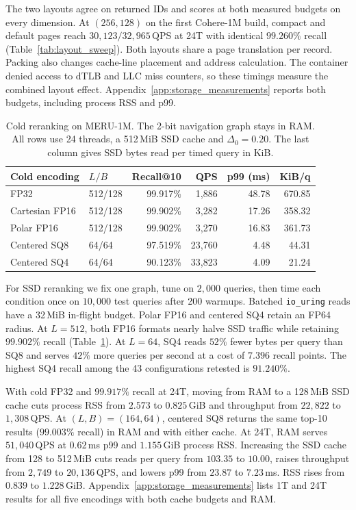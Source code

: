 The two layouts agree on returned IDs and scores at both measured budgets on every dimension. At $(256,128)$ on the first {Cohere-1M} build, compact and default pages reach $30{,}123/32{,}965$\,QPS at 24T with identical $99.260\%$ recall (Table~\ref{tab:layout_sweep}). Both layouts share a page translation per record. Packing also changes cache-line placement and address calculation. The container denied access to dTLB and LLC miss counters, so these timings measure the combined layout effect. Appendix~\ref{app:storage_measurements} reports both budgets, including process RSS and p99.

\begin{table}[t]
  \centering
  \caption{Cold reranking on {MERU-1M}. The 2-bit navigation graph stays in RAM. All rows use 24 threads, a 512\,MiB SSD cache and $\Delta_0=0.20$. The last column gives SSD bytes read per timed query in KiB.}
  \label{tab:meru_ssd}
  \footnotesize
  \setlength{\tabcolsep}{3pt}
  \begin{tabular}{@{}llrrrr@{}}
    \toprule
    Cold encoding & $L/B$ & Recall@10 & QPS & p99 (ms) & KiB/q \\
    \midrule
    FP32           & 512/128 & 99.917\% & 1,886 & 48.78 & 670.85 \\
    Cartesian FP16  & 512/128 & 99.902\% & 3,282 & 17.26 & 358.32 \\
    Polar FP16     & 512/128 & 99.902\% & 3,270 & 16.83 & 361.73 \\
    \midrule
    Centered SQ8    & 64/64 & 97.519\% & 23,760 & 4.48 & 44.31 \\
    Centered SQ4    & 64/64 & 90.123\% & 33,823 & 4.09 & 21.24 \\
    \bottomrule
  \end{tabular}
\end{table}

For SSD reranking we fix one graph, tune on $2{,}000$ queries, then time each condition once on $10{,}000$ test queries after 200 warmups. Batched \texttt{io\_uring} reads have a 32\,MiB in-flight budget. Polar FP16 and centered SQ4 retain an FP64 radius. At $L=512$, both FP16 formats nearly halve SSD traffic while retaining $99.902\%$ recall (Table~\ref{tab:meru_ssd}). At $L=64$, SQ4 reads $52\%$ fewer bytes per query than SQ8 and serves $42\%$ more queries per second at a cost of $7.396$ recall points. The highest SQ4 recall among the 43 configurations retested is $91.240\%$.

With cold FP32 and $99.917\%$ recall at 24T, moving from RAM to a 128\,MiB SSD cache cuts process RSS from $2.573$ to $0.825$\,GiB and throughput from $22{,}822$ to $1{,}308$\,QPS. At $(L,B)=(164,64)$, centered SQ8 returns the same top-10 results ($99.003\%$ recall) in RAM and with either cache. At 24T, RAM serves $51{,}040$\,QPS at $0.62$\,ms p99 and $1.155$\,GiB process RSS. Increasing the SSD cache from 128 to 512\,MiB cuts reads per query from $103.35$ to $10.00$, raises throughput from $2{,}749$ to $20{,}136$\,QPS, and lowers p99 from $23.87$ to $7.23$\,ms. RSS rises from $0.839$ to $1.228$\,GiB. Appendix~\ref{app:storage_measurements} lists 1T and 24T results for all five encodings with both cache budgets and RAM.
